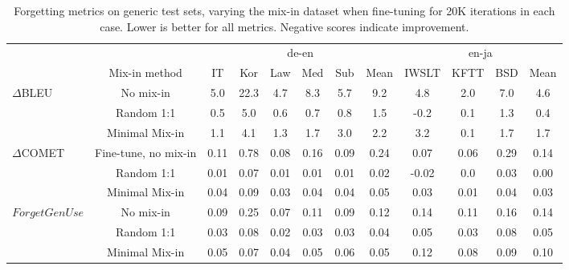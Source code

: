 \documentclass[11pt]{article}
\begin{document}
\begin{table*}[h!]
    \centering
   \small 
    \begin{tabular}{p{1.8cm}c| ccccc|c| ccc|c}
    & &  \multicolumn{6}{c|}{de-en} &  \multicolumn{4}{c}{en-ja}\\
  &  Mix-in method     & IT & Kor &Law &Med  & Sub & Mean &  IWSLT  &KFTT &BSD & Mean \\
             \hline
     \multirow{3}{*}{$\Delta$BLEU} &    No mix-in & 5.0 &22.3 & 4.7 & 8.3 & 5.7& 9.2   & 4.8   & 2.0 & 7.0& 4.6 \\
    &     Random 1:1 & 0.5& 5.0 & 0.6 &  0.7&  0.8 & 1.5  &-0.2  & 0.1 &1.3 & 0.4  \\

    &    Minimal Mix-in & 1.1 &4.1 & 1.3 & 1.7  &3.0 & 2.2 & 3.2  & 0.1 & 1.7& 1.7\\
 \hline
  \multirow{3}{*}{$\Delta$COMET} &     Fine-tune, no mix-in & 0.11 & 0.78 & 0.08 & 0.16 & 0.09 & 0.24 &  0.07 &0.06 & 0.29 & 0.14 \\
  &       Random 1:1 & 0.01& 0.07 & 0.01 & 0.01& 0.01 & 0.02&  -0.02&0.0 & 0.03& 0.00\\

   &     Minimal Mix-in & 0.04 & 0.09  & 0.03 & 0.04 & 0.04 & 0.05 & 0.03 & 0.01 & 0.04 & 0.03  \\
\hline
   \multirow{3}{*}{$ForgetGenUse$}    &   No mix-in &  0.09 & 0.25  & 0.07  & 0.11  & 0.09 & 0.12 &0.14 &0.11 & 0.16 & 0.14\\
     &   Random 1:1 & 0.03 & 0.08 & 0.02 & 0.03 & 0.03  & 0.04  & 0.05 &0.03 &0.08 & 0.05 \\

      & Minimal Mix-in & 0.05 & 0.07 & 0.04 & 0.05 & 0.06  & 0.05  &  0.12 & 0.08& 0.09& 0.10  \\


    \end{tabular}
    \caption{Forgetting metrics on generic test sets, varying the mix-in dataset when fine-tuning for 20K iterations in each case. Lower is better for all metrics. Negative scores indicate improvement.
    }
    \label{tab:mixinbleu-generic}
\end{table*}
\end{document}
